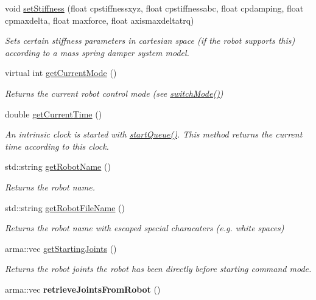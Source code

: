\begin{DoxyCompactItemize}
\item 
void \hyperlink{classkukadu_1_1PlottingControlQueue_a676d19be17f169e3e411fd8f673b5d3d}{set\-Stiffness} (float cpstiffnessxyz, float cpstiffnessabc, float cpdamping, float cpmaxdelta, float maxforce, float axismaxdeltatrq)
\begin{DoxyCompactList}\small\item\em Sets certain stiffness parameters in cartesian space (if the robot supports this) according to a mass spring damper system model. \end{DoxyCompactList}\item 
virtual int \hyperlink{classkukadu_1_1PlottingControlQueue_a1cac1433bdc6072e4de8be13b113a6c4}{get\-Current\-Mode} ()
\begin{DoxyCompactList}\small\item\em Returns the current robot control mode (see \hyperlink{classkukadu_1_1PlottingControlQueue_ace69c9adaff27b5d98a42e70f7bc64ff}{switch\-Mode()}) \end{DoxyCompactList}\item 
double \hyperlink{classkukadu_1_1PlottingControlQueue_a8ec0f4f18120273577e913a8d96cc125}{get\-Current\-Time} ()
\begin{DoxyCompactList}\small\item\em An intrinsic clock is started with \hyperlink{classkukadu_1_1ControlQueue_a35d6a6e4e7c8467691c11567fe21f340}{start\-Queue()}. This method returns the current time according to this clock. \end{DoxyCompactList}\item 
std\-::string \hyperlink{classkukadu_1_1PlottingControlQueue_a730d43f700bf8b4cf55ba4cf63cb1fec}{get\-Robot\-Name} ()
\begin{DoxyCompactList}\small\item\em Returns the robot name. \end{DoxyCompactList}\item 
std\-::string \hyperlink{classkukadu_1_1PlottingControlQueue_a1369090faea626819b1c43acf3ce08d1}{get\-Robot\-File\-Name} ()
\begin{DoxyCompactList}\small\item\em Returns the robot name with escaped special characaters (e.\-g. white spaces) \end{DoxyCompactList}\item 
arma\-::vec \hyperlink{classkukadu_1_1PlottingControlQueue_aa45636924606a9f4cf09ff2b65108bad}{get\-Starting\-Joints} ()
\begin{DoxyCompactList}\small\item\em Returns the robot joints the robot has been directly before starting command mode. \end{DoxyCompactList}\item 
\hypertarget{classkukadu_1_1PlottingControlQueue_aff296baa49abc7d92bb20736823824d5}{arma\-::vec {\bfseries retrieve\-Joints\-From\-Robot} ()}\label{classkukadu_1_1PlottingControlQueue_aff296baa49abc7d92bb20736823824d5}


\end{DoxyCompactItemize}
